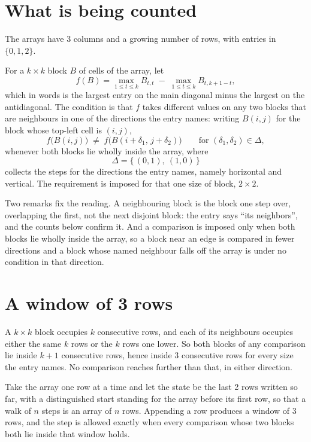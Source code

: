 \documentclass[11pt,a4paper]{article}
\theoremstyle{plain}
\theoremstyle{definition}
\begin{document}
\section{What is being counted}

The arrays have $3$ columns and a growing number of rows, with entries in $\{0,1,2\}$.

For a $k\times k$ block $B$ of cells of the array, let
\[
f(B)=\max_{1\le t\le k}B_{t,t}\;-\;\max_{1\le t\le k}B_{t,k+1-t} ,
\]
which in words is the largest entry on the main diagonal minus the largest on the antidiagonal. The condition is that $f$ takes different values on any two blocks that
are neighbours in one of the directions the entry names: writing $B(i,j)$ for the block whose
top-left cell is $(i,j)$,
\[
f\bigl(B(i,j)\bigr)\;\neq\;f\bigl(B(i+\delta_1,\,j+\delta_2)\bigr)
\qquad\text{for }(\delta_1,\delta_2)\in\Delta,
\]
whenever both blocks lie wholly inside the array, where
\[
\Delta=\{\,(0,1),\ (1,0)\,\}
\]
collects the steps for the directions the entry names, namely horizontal and vertical. The
requirement is imposed for that one size of block, $2\times2$.

Two remarks fix the reading. A neighbouring block is the block one step over, overlapping the
first, not the next disjoint block: the entry says ``its neighbors'', and the counts below
confirm it. And a comparison is imposed only when both blocks lie wholly inside the array, so a
block near an edge is compared in fewer directions and a block whose named neighbour falls off
the array is under no condition in that direction.

\section{A window of 3 rows}

A $k\times k$ block occupies $k$ consecutive rows, and each of its neighbours occupies either
the same $k$ rows or the $k$ rows one lower. So both blocks of any comparison lie inside $k+1$
consecutive rows, hence inside $3$ consecutive rows for every size the entry names. No
comparison reaches further than that, in either direction.

Take the array one row at a time and let the state be the last 2 rows written so far, with a
distinguished start standing for the array before its first row, so that a walk of $n$ steps is
an array of $n$ rows. Appending a row produces a window of $3$ rows, and the step is
allowed exactly when every comparison whose two blocks both lie inside that window holds.
\end{document}
